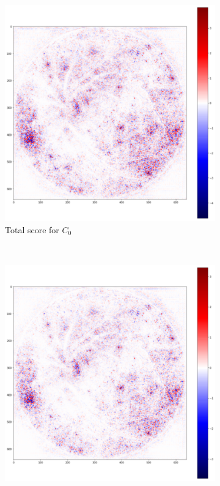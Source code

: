 \documentclass[preprint]{elsarticle}
\theoremstyle{definition} %
\theoremstyle{remark}
\begin{document}
\begin{figure}[h!]
	\centering
	\begin{subfigure}[b]{0.43\textwidth}
		\includegraphics[width=\textwidth]{figures/score-prop-23713_left/score_total_c0.png}
		\caption{Total score for $C_0$}
	\end{subfigure}~
	\begin{subfigure}[b]{0.43\textwidth}		
		\includegraphics[width=\textwidth]{figures/score-prop-23713_left/score_total_c1.png}

\end{subfigure}
\end{figure}
\end{document}
